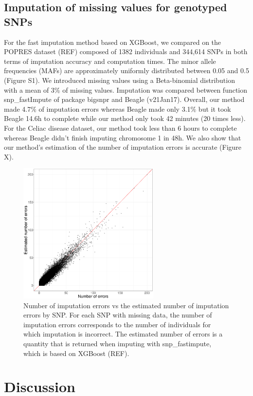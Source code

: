 \documentclass{bioinfo}
\begin{document}
\subsection{Imputation of missing values for genotyped SNPs}

For the fast imputation method based on XGBoost, we compared on the POPRES dataset (REF) composed of 1382 individuals and 344,614 SNPs in both terms of imputation accuracy and computation times. The minor allele frequencies (MAFs) are approximately uniformly distributed between 0.05 and 0.5 (Figure S1). We introduced missing values using a Beta-binomial distribution with a mean of 3\% of missing values. Imputation was compared between function snp\_fastImpute of package bigsnpr and Beagle (v21Jan17). Overall, our method made 4.7\% of imputation errors whereas Beagle made only 3.1\% but it took Beagle 14.6h to complete while our method only took 42 minutes (20 times less). For the Celiac disease dataset, our method took less than 6 hours to complete whereas Beagle didn't finish imputing chromosome 1 in 48h. We also show that our method's estimation of the number of imputation errors is accurate (Figure X).

\begin{figure}[!tpb]
\centerline{\includegraphics[width=200pt]{error-impute}}
\caption{Number of imputation errors vs the estimated number of imputation errors by SNP. For each SNP with missing data, the number of imputation errors corresponds to the number of individuals for which imputation is incorrect. The estimated number of errors is a quantity that is returned when imputing with snp\_fastimpute, which is based on XGBoost (REF).}\label{fig:error-impute}
\end{figure}

\section{Discussion}
\end{document}
